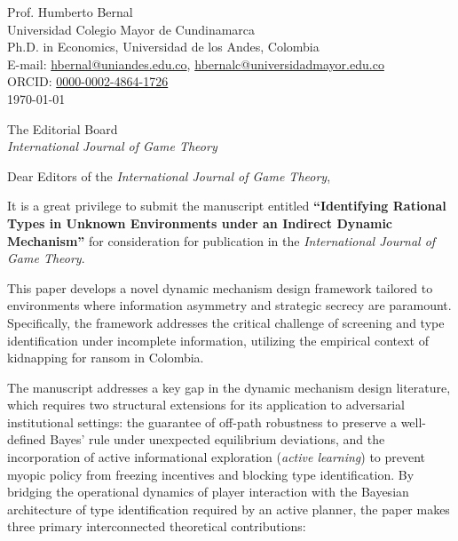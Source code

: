 \documentclass[12pt]{article}
\begin{document}
\singlespacing

\begin{flushright}
Prof. Humberto Bernal \\
Universidad Colegio Mayor de Cundinamarca \\
Ph.D. in Economics, Universidad de los Andes, Colombia \\
E-mail: \href{mailto:hbernal@uniandes.edu.co}{hbernal@uniandes.edu.co}, \href{mailto:hbernalc@universidadmayor.edu.co}{hbernalc@universidadmayor.edu.co} \\
ORCID: \href{https://orcid.org/0000-0002-4864-1726}{0000-0002-4864-1726} \\
\today
\end{flushright}

\vspace{1.5em}

\begin{flushleft}
The Editorial Board \\
\textit{International Journal of Game Theory}
\end{flushleft}

\vspace{1.5em}

\noindent Dear Editors of the \textit{International Journal of Game Theory},

\vspace{1.5em}

\noindent It is a great privilege to submit the manuscript entitled \textbf{``Identifying Rational Types in Unknown Environments under an Indirect Dynamic Mechanism''} for consideration for publication in the \textit{International Journal of Game Theory}.

This paper develops a novel dynamic mechanism design framework tailored to environments where information asymmetry and strategic secrecy are paramount. Specifically, the framework addresses the critical challenge of screening and type identification under incomplete information, utilizing the empirical context of kidnapping for ransom in Colombia. 

The manuscript addresses a key gap in the dynamic mechanism design literature, which requires two structural extensions for its application to adversarial institutional settings: the guarantee of off-path robustness to preserve a well-defined Bayes' rule under unexpected equilibrium deviations, and the incorporation of active informational exploration (\textit{active learning}) to prevent myopic policy from freezing incentives and blocking type identification. By bridging the operational dynamics of player interaction with the Bayesian architecture of type identification required by an active planner, the paper makes three primary interconnected theoretical contributions:
\end{document}
